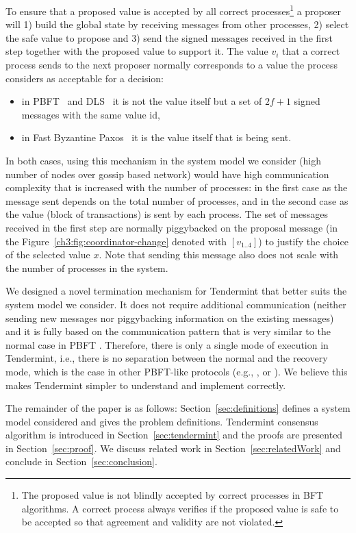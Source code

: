 To ensure that a proposed value is accepted by all correct processes\footnote{The proposed value is not blindly accepted by correct processes in BFT algorithms. A correct process always verifies if the proposed value is safe to be accepted so that agreement and validity are not violated.} a proposer will 1) build the global state by receiving messages from other processes, 2) select the safe value to propose and 3) send the signed messages received in the first step together with the proposed value to support it. The value $v_i$ that a correct process sends to the next proposer normally corresponds to a value the process considers as acceptable for a decision: 

\begin{itemize}
	\item in PBFT~\cite{CL99:osdi} and DLS~\cite{DLS88:jacm} it is not the value itself but a set of $2f+1$ signed messages with the same value id,
	\item in Fast Byzantine Paxos~\cite{MA06:tdsc} it is the value itself that is being sent.  
\end{itemize}

In both cases, using this mechanism in the system model we consider (high number of nodes over gossip based network) would have high communication complexity that is increased with the number of processes: in the first case as the message sent depends on the total number of processes, and in the second case as the value (block of transactions) is sent by each process. The set of messages received in the first step are normally piggybacked on the proposal message (in the Figure~\ref{ch3:fig:coordinator-change} denoted with $[v_{1..4}]$) to justify the choice of the selected value $x$. Note that sending this message also does not scale with the number of processes in the system.   

We designed a novel termination mechanism for Tendermint that better suits the system model we consider. It does not require additional communication (neither sending new messages nor piggybacking information on the existing messages) and it is
fully based on the communication pattern that is very similar to the normal case in PBFT \cite{CL99:osdi}. Therefore, there is only a single mode of execution in Tendermint, i.e., there is no separation between the normal and the recovery mode, which is the case in other PBFT-like protocols (e.g., \cite{CL99:osdi}, \cite{Ver09:spinning} or \cite{Cle09:aardvark}). We believe this makes Tendermint simpler to understand and implement correctly.  

The remainder of the paper is as follows: Section~\ref{sec:definitions} defines a system model considered and gives the problem definitions. Tendermint consensus algorithm 
is introduced in Section~\ref{sec:tendermint} and the proofs are presented in Section~\ref{sec:proof}. We discuss related work in Section~\ref{sec:relatedWork} and conclude in Section~\ref{sec:conclusion}.  
